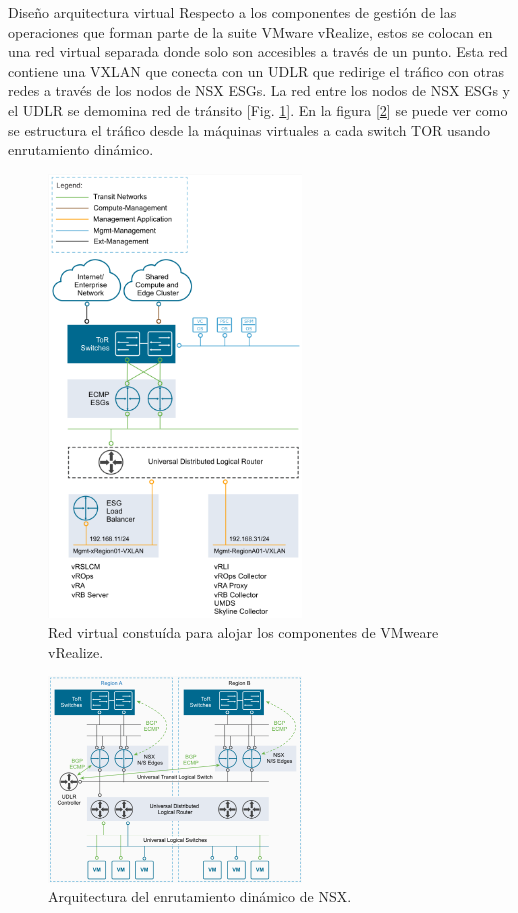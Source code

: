 \begin{subsection}{Diseño arquitectura virtual}
Respecto a los componentes de gestión de las operaciones que forman parte de la suite VMware vRealize, estos se colocan en una red virtual separada donde solo son accesibles a través de un punto. Esta red contiene una VXLAN que conecta con un UDLR que redirige el tráfico con otras redes a través de los nodos de NSX ESGs. La red entre los nodos de NSX ESGs y el UDLR se demomina red de tránsito [Fig. \ref{fig:vrealizeArch}]. En la figura [\ref{fig:udlrArch}] se puede ver como se estructura el tráfico desde la máquinas virtuales a cada switch TOR usando enrutamiento dinámico.

\begin{figure}[h!]
  \centering
  \includegraphics[width=0.6\textwidth]{imaxes/conceptosPrevios/vrealizeARCH.png}
  \caption{Red virtual constuída para alojar los componentes de VMweare vRealize.}
  \label{fig:vrealizeArch}
\end{figure}
\begin{figure}[h!]
  \centering
  \includegraphics[width=0.6\textwidth]{imaxes/conceptosPrevios/UDLRroutingNSX.png}
  \caption{Arquitectura del enrutamiento dinámico de NSX.}
  \label{fig:udlrArch}
\end{figure}
\FloatBarrier



\end{subsection}
